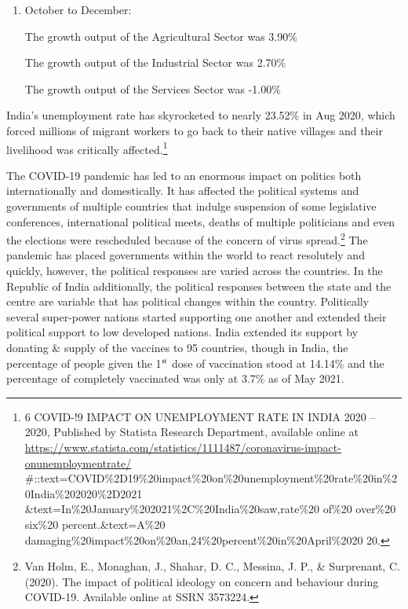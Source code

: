 \begin{multicols}{2}
\begin{enumerate}[label=$\blacktriangleright$]
The growth output of the Industrial Sector was -2.10\%
 
The growth output of the Services Sector was -11.40\% 

\item October to December:

The growth output of the Agricultural Sector was 3.90\%

The growth output of the Industrial Sector was 2.70\%

The growth output of the Services Sector was -1.00\%
\end{enumerate}

\vspace{-.3cm}

\noi
India’s unemployment rate has skyrocketed to nearly 23.52\% in Aug 2020, which
forced millions of migrant workers to go back to their native villages and their
livelihood was critically affected.\footnote{6 COVID-!9 IMPACT ON UNEMPLOYMENT RATE IN INDIA 2020 – 2020, Published by Statista Research Department, available online at\\ \url{https://www.statista.com/statistics/1111487/coronavirus-impact-onunemploymentrate/}\\\#::text=COVID\%2D19\%20impact\%20on\%20unemployment\%20rate\%20in\%20India\%202020\%2D2021 \&text=In\%20January\%202021\%2C\%20India\%20saw,rate\%20 of\%20 over\%20 six\%20 percent.\&text=A\%20 damaging\%20impact\%20on\%20an,24\%20percent\%20in\%20April\%2020 20.}


\noi
The COVID-19 pandemic has led to an enormous impact on politics both internationally and
domestically. It has affected the political systems and governments of multiple countries that
indulge suspension of some legislative conferences, international political meets, deaths of
multiple politicians and even the elections were rescheduled because of the concern of virus
spread.\footnote{Van Holm, E., Monaghan, J., Shahar, D. C., Messina, J. P., \& Surprenant, C. (2020). The impact of political ideology on concern and behaviour during COVID-19. Available online at SSRN 3573224.} The pandemic has placed governments within the world to react resolutely and
quickly, however, the political responses are varied across the countries. In the Republic of
India additionally, the political responses between the state and the centre are variable that
has political changes within the country. Politically several super-power nations started
supporting one another and extended their political support to low developed nations. India
extended its support by donating \& supply of the vaccines to 95 countries, though in India,
the percentage of people given the 1$^{\rm st}$ dose of vaccination stood at 14.14\% and the percentage
of completely vaccinated was only at 3.7\% as of May 2021. 


\end{multicols}
